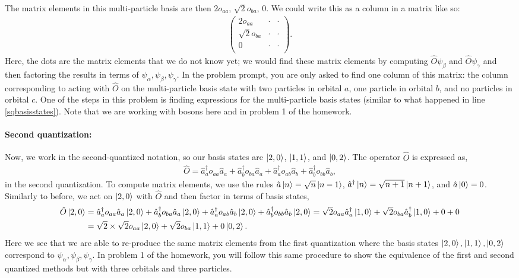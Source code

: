 \documentclass[10pt]{article}
\newcommand{\1}{\mathbf 1}
\begin{document}
The matrix elements in this multi-particle basis are then $2o_{aa}$, $\sqrt{2}o_{ba}$, $0$.
We could write this as a column in a matrix like so:
\begin{align}
	\left(
		\begin{array}{ccc}
			2 o_{aa} & \cdot & \cdot\\
			\sqrt{2} o_{ba} & \cdot & \cdot\\
			0 & \cdot & \cdot\\
		\end{array}
	\right).
\end{align}
Here, the dots are the matrix elements that we do not know yet; we would find these matrix elements by computing $\hat O \psi_\beta$ and $\hat O \psi_\gamma$ and then factoring the results in terms of $\psi_\alpha, \psi_\beta, \psi_\gamma$.
In the problem prompt, you are only asked to find one column of this matrix: the column corresponding to acting with $\hat O$ on the multi-particle basis state with two particles in orbital $a$, one particle in orbital $b$, and no particles in orbital $c$.
One of the steps in this problem is finding expressions for the multi-particle basis states (similar to what happened in line \ref{sqbasisstates}).
Note that we are working with bosons here and in problem 1 of the homework.

\paragraph{Second quantization:}

Now, we work in the second-quantized notation, so our basis states are $\ket{2,0}$, $\ket{1,1}$, and $\ket{0,2}$.
The operator $\hat O$ is expressed as,
\begin{align}
	\hat O =
	\hat a_a^\dagger
	o_{aa}
	\hat a_a
	+
	\hat a_b^\dagger
	o_{ba}
	\hat a_a
	+
	\hat a_a^\dagger
	o_{ab}
	\hat a_b
	+
	\hat a_b^\dagger
	o_{bb}
	\hat a_b,
\end{align}
in the second quantization.
To compute matrix elements, we use the rules $\hat a \ket{n} = \sqrt{n} \ket{n-1}$, $\hat a^\dagger \ket{n} = \sqrt{n+1} \ket{n+1}$, and $\hat a\ket{0} = 0$.
Similarly to before, we act on $\ket{2,0}$ with $\hat O$ and then factor in terms of basis states,
\begin{align}
	\hat O \ket{2,0}
	&=\nonumber
	\hat a_a^\dagger
	o_{aa}
	\hat a_a
	\ket{2,0}
	+
	\hat a_b^\dagger
	o_{ba}
	\hat a_a
	\ket{2,0}
	+
	\hat a_a^\dagger
	o_{ab}
	\hat a_b
	\ket{2,0}
	+
	\hat a_b^\dagger
	o_{bb}
	\hat a_b
	\ket{2,0}
	=
	\sqrt{2}
	o_{aa}
	\hat a_a^\dagger
	\ket{1,0}
	+
	\sqrt{2}
	o_{ba}
	\hat a_b^\dagger
	\ket{1,0}
	+
	0
	+
	0
	\\
	&=
	\sqrt{2} \times \sqrt{2} o_{aa} \ket{2,0}
	+
	\sqrt{2}
	o_{ba}
	\ket{1,1}
	+
	0 \ket{0,2}.
\end{align}
Here we see that we are able to re-produce the same matrix elements from the first quantization where the basis states $\ket{2,0}, \ket{1,1},\ket{0,2}$ correspond to $\psi_\alpha,\psi_\beta,\psi_\gamma$.
In problem 1 of the homework, you will follow this same procedure to show the equivalence of the first and second quantized methods but with three orbitals and three particles.
\end{document}
